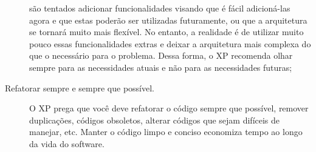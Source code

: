 \begin{description}
    são tentados adicionar funcionalidades visando que é fácil adicioná-las agora e
    que estas poderão ser utilizadas futuramente, ou que a arquitetura se tornará
    muito mais flexível. No entanto, a realidade é de utilizar muito pouco essas
    funcionalidades extras e deixar a arquitetura mais complexa do que o necessário
    para o problema. Dessa forma, o \gls{XP} recomenda olhar sempre para as
    necessidades atuais e não para as necessidades futuras;
    \item[Refatorar sempre e sempre que possível.] O \gls{XP} prega que você deve
    refatorar o código sempre que possível, remover duplicações, códigos obsoletos,
    alterar códigos que sejam difíceis de manejar, etc. Manter o código limpo e
    conciso economiza tempo ao longo da vida do software.
\end{description}

